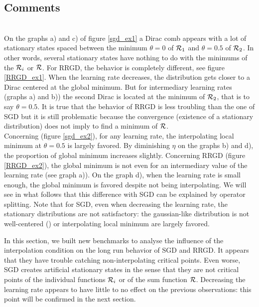 \documentclass[article,authoryear,jmlmc]{beg_32}             %
\begin{document}
\subsection{Comments}
~~\\
On the graphs a) and c) of figure \ref{sgd_ex1} a Dirac comb appears with a lot of stationary states spaced between the minimum $\theta=0$ of $\mathcal{R}_1$ and $\theta=0.5$ of $\mathcal{R}_2$. In
other words, several stationary states have nothing to do with the minimums of the $\mathcal{R}_i$ or $\mathcal{R}$. 
 For RRGD, the behavior is completely different, see figure \ref{RRGD_ex1}. When the learning rate decreases, the distribution gets closer to a Dirac centered at the global
 minimum. But for intermediary learning rates (graphs a) and b)) the second Dirac is located at the minimum of $\mathcal{R}_2$, that is to say $\theta=0.5$. It is true that the behavior of RRGD is less troubling than the one of SGD but it is still problematic because the convergence (existence of a stationary distribution) does not imply to find a minimum of $\mathcal{R}$. \\
Concerning \exTwo (figure \ref{sgd_ex2}), for any learning rate, the interpolating local minimum at $\theta=0.5$ is largely favored. By diminishing $\eta$ on the graphs b) and d), the proportion of global minimum increases slightly. 
Concerning RRGD (figure \ref{RRGD_ex2}), the global minimum is not  even for an intermediary value of the learning rate (see graph a)). On the graph d), when the learning rate is small enough, the global minimum is favored despite not being interpolating. We will see in what follows that this difference with SGD can be explained by operator splitting. 
Note that for SGD, even when decreasing the learning rate, the stationary distributions are not satisfactory: the gaussian-like distribution is not well-centered (\exOne) or interpolating
local minimum are largely favored.

In this section, we built new benchmarks to analyse the influence of the interpolation condition on the long run behavior of SGD and RRGD. It appears that they have trouble
catching non-interpolating critical points. Even worse, SGD creates artificial stationary states in the sense that they are not critical points of the individual functions $\mathcal{R}_i$
or of the sum function $\mathcal{R}$. Decreasing the learning rate appears to have little to no effect on the previous observations: this point will be confirmed in the next section. 
\end{document}
